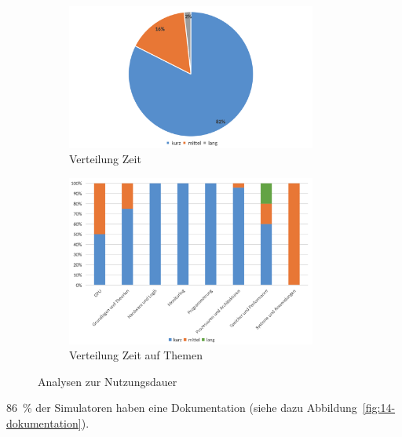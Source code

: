 \begin{figure}[!htbp]
    \centering
    \begin{subfigure}[b]{0.48\textwidth}
        \centering
        \includegraphics[width=0.90\textwidth]{graphics_sim/12-zeit.png}
        \caption{Verteilung Zeit}
        \label{fig:12-zeit}
    \end{subfigure}
    \hfill
    \begin{subfigure}[b]{0.48\textwidth}
        \centering
        \includegraphics[width=0.90\textwidth]{graphics_sim/13-zeit-thema.png}
        \caption{Verteilung Zeit auf Themen}
        \label{fig:13-vorwissen-thema}
    \end{subfigure}
    \caption{Analysen zur Nutzungsdauer}
    \label{fig:nutzungsdauer-gesamt}
\end{figure}

86~\% der Simulatoren haben eine Dokumentation (siehe dazu Abbildung~\ref{fig:14-dokumentation}).

